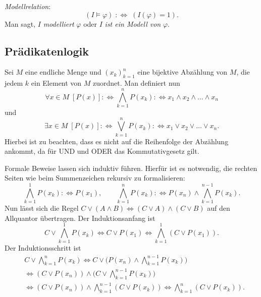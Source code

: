 \documentclass[a4paper,11pt,fleqn,twoside]{scrartcl}
\numberwithin{equation}{section}
\newcommand{\defiff}{\;:\Longleftrightarrow\;}
\newcommand{\strong}[1]{{\normalfont\sffamily\bfseries #1}}
\newenvironment{Definition}{\par\noindent\strong{Definition.}}{\par}
\newcommand{\emdef}[1]{\emph{#1}}
\begin{document}
\vspace{10pt}
\begin{Definition}
\emdef{Modellrelation}:
\begin{equation}
(I\models\varphi) \defiff (I(\varphi)=1).
\end{equation}
Man sagt, $I$ \emdef{modelliert} $\varphi$ oder
$I$ \emdef{ist ein Modell von} $\varphi$.
\end{Definition}

\subsection{Prädikatenlogik}
Sei $M$ eine endliche Menge und $(x_k)_{k=1}^n$ eine bijektive
Abzählung von $M$, die jedem $k$ ein Element von $M$ zuordnet.
Man definiert nun
\begin{equation}
\forall x{\in}M\;[P(x)] :\Longleftrightarrow \bigwedge_{k=1}^n P(x_k) :\Longleftrightarrow x_1\land x_2\land\ldots\land x_n
\end{equation}
und
\begin{equation}
\exists x{\in}M\;[P(x)] :\Longleftrightarrow \bigvee_{k=1}^n P(x_k) :\Longleftrightarrow x_1\lor x_2\lor\ldots\lor x_n.
\end{equation}
Hierbei ist zu beachten, dass es nicht auf die Reihenfolge der
Abzählung ankommt, da für UND und ODER das Kommutativgesetz gilt.

Formale Beweise lassen sich induktiv führen. Hierfür ist es notwendig,
die rechten Seiten wie beim Summenzeichen rekursiv zu formalisieren:
\begin{equation}
\bigwedge_{k=1}^1 P(x_k) :\Longleftrightarrow P(x_1),\qquad
\bigwedge_{k=1}^n P(x_k) :\Longleftrightarrow P(x_n)\land\bigwedge_{k=1}^{n-1} P(x_k).
\end{equation}
Nun lässt sich die Regel $C\lor (A\land B)\iff (C\lor A)\land(C\lor B)$
auf den Allquantor übertragen. Der Induktionsanfang ist
\begin{equation}
C\lor\bigwedge_{k=1}^1 P(x_k) \iff C\lor P(x_1) \iff \bigwedge_{k=1}^1 (C\lor P(x_1)).
\end{equation}
Der Induktionsschritt ist
\begin{align}
& C\lor\!\bigwedge_{k=1}^n P(x_k)
\iff C\lor\bigg(P(x_n)\land\bigwedge_{k=1}^{n-1} P(x_k)\bigg)\\
&\iff (C\lor P(x_n))\land\bigg(C\lor\!\bigwedge_{k=1}^{n-1} P(x_k)\bigg)\\
&\iff (C\lor P(x_n))\land\bigwedge_{k=1}^{n-1} (C\lor P(x_k))
\iff \bigwedge_{k=1}^{n} (C\lor P(x_k)).
\end{align}
\end{document}
